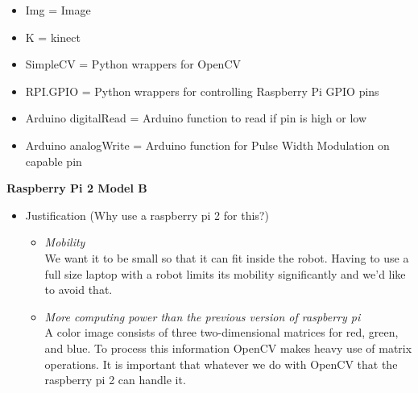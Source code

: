 \documentclass[12pt]{article}
\begin{document}
\begin{description}
		\begin{itemize}
			\item Img = Image
			\item K = kinect
			\item SimpleCV = Python wrappers for OpenCV
			\item RPI.GPIO = Python wrappers for controlling Raspberry Pi GPIO pins
			\item Arduino digitalRead = Arduino function to read if pin is high or low
			\item Arduino analogWrite = Arduino function for Pulse Width Modulation on capable pin
		\end{itemize}
		\newpage
		\textbf{Raspberry Pi 2 Model B}
		\begin{itemize}
			\item Justification (Why use a raspberry pi 2 for this?)
				\begin{itemize}
					\item \textit{Mobility} \\
						We want it to be small so that it can fit inside the robot. Having to use a full size laptop with a robot limits its mobility significantly and we'd like to avoid that.
					\item \textit{More computing power than the previous version of raspberry pi} \\
						A color image consists of three two-dimensional matrices for red, green, and blue. To process this information OpenCV makes heavy use of matrix operations.
						It is important that whatever we do with OpenCV that the raspberry pi 2 can handle it.

\end{itemize}
\end{itemize}
\end{description}
\end{document}
